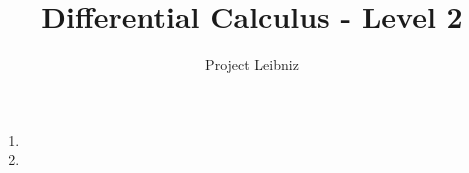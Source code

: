\documentclass{book}
\title{Differential Calculus - Level 2}
\author{Project Leibniz}
\begin{document}
\maketitle

\begin{enumerate}
    \item 
    \item 
\end{enumerate}
\end{document}
